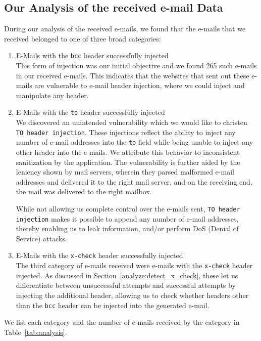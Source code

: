 \subsection[Analysis of Data]{Our Analysis of the received e-mail Data}
During our analysis of the received e-mails, we found that the e-mails that we received belonged to one of three broad categories:
\begin{enumerate}
	\item E-Mails with the \texttt{bcc} header successfully injected\\
	This form of injection was our initial objective and we found 265 such e-mails in our received e-mails. This indicates that the websites that sent out these e-mails are vulnerable to e-mail header injection, where we could inject and manipulate any header.
	
	\item E-Mails with the \texttt{to} header successfully injected\\
	We discovered an unintended vulnerability which we would like to christen \texttt{TO~header injection}. These injections reflect the ability to inject any number of e-mail addresses into the \texttt{to} field while being unable to inject any other header into the e-mails. We attribute this behavior to inconsistent sanitization by the application. 
	The vulnerability is further aided by the leniency shown by mail servers, wherein they parsed malformed e-mail addresses and delivered it to the right mail server, and on the receiving end, the mail was delivered to the right mailbox. 
	
	While not allowing us complete control over the e-mails sent, \texttt{TO header injection} makes it possible to append any number of e-mail addresses, thereby enabling us to leak information, and/or perform DoS (Denial of Service) attacks.
	
	\item E-Mails with the \texttt{x-check} header successfully injected\\
    The third category of e-mails received were e-mails with the \texttt{x-check} header injected. As discussed in Section~\ref{analyze:detect_x_check}, 
    these let us differentiate between unsuccessful attempts and successful attempts by injecting the additional header, allowing us to check whether headers other than the \texttt{bcc} header can be injected into the generated e-mail. 
\end{enumerate}
We list each category and the number of e-mails received by the category in Table~\ref{tab:analysis}. 


